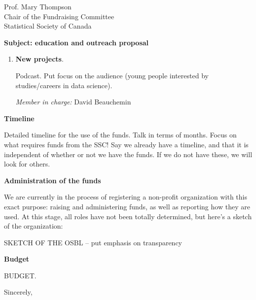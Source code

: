 \documentclass[11pt, a4paper]{letter} %
\begin{document}
\begin{letter}{
	Prof. Mary Thompson\\
	Chair of the Fundraising Committee\\
	Statistical Society of Canada
	
	\bigskip
	\textbf{Subject: education and outreach proposal}%
}
\begin{enumerate}
**[MORE ON: WE WANT TO EDUCATE THE GENERAL PUBLIC ABOUT WHAT DATA SCIENCE CAN DO FOR THEM.]**
			
	\bigskip
	\emph{Member in charge:} Nicolas Garneau\\
	
	\item \textbf{New projects}.
	
	\quad Podcast. Put focus on the audience (young people interested by studies/careers in data science).
	
	\bigskip
	\emph{Member in charge:} David Beauchemin
\end{enumerate}




\noindent \textbf{Timeline}

Detailed timeline for the use of the funds. Talk in terms of months. Focus on what requires funds from the SSC! Say we already have a timeline, and that it is independent of whether or not we have the funds. If we do not have these, we will look for others.


\noindent \textbf{Administration of the funds}

We are currently in the process of registering a non-profit organization with this exact purpose: raising and administering funds, as well as reporting how they are used. At this stage, all roles have not been totally determined, but here's a sketch of the organization:

SKETCH OF THE OSBL -- put emphasis on transparency


\noindent \textbf{Budget}

BUDGET.



%
      
\closing{Sincerely,}




\end{letter}
\end{document}
